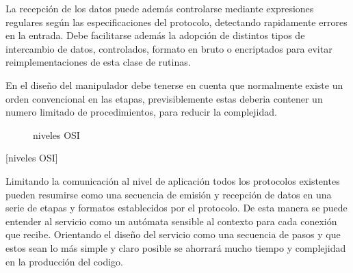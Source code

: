 \documentclass[a4paper,spanish,12pt]{book}
\begin{document}
La recepción de los datos puede además controlarse mediante expresiones regulares según las especificaciones del protocolo, detectando rapidamente errores en la entrada. Debe facilitarse además la adopción de distintos tipos de intercambio de datos, controlados, formato en bruto o encriptados para evitar reimplementaciones de esta clase de rutinas.

En el diseño del manipulador debe tenerse en cuenta que normalmente existe un orden convencional en las etapas, previsiblemente estas deberia contener un numero limitado de procedimientos, para reducir la complejidad.



\begin{figure}
	  \centering
              \caption{niveles OSI}
  \label{fig:ejemplo}
\end{figure}

[niveles OSI]

Limitando la comunicación al nivel de aplicación todos los protocolos existentes pueden resumirse como una secuencia de emisión y recepción de datos en una serie de etapas y formatos establecidos por el protocolo. 
De esta manera se puede entender al servicio como un autómata sensible al contexto para cada conexión que recibe. Orientando el diseño del servicio como una secuencia de pasos y que estos sean lo más simple y claro posible se ahorrará mucho tiempo y complejidad en la producción del codigo. 
\end{document}
